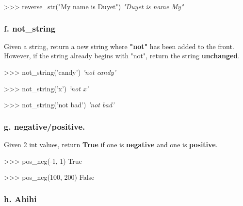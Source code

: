 \documentclass[11pt]{article}
\newenvironment{Shaded}{}{}
\newcommand{\DecValTok}[1]{\textcolor[rgb]{0.25,0.63,0.44}{{#1}}}
\newcommand{\StringTok}[1]{\textcolor[rgb]{0.25,0.44,0.63}{{#1}}}
\newcommand{\CommentTok}[1]{\textcolor[rgb]{0.38,0.63,0.69}{\textit{{#1}}}}
\newcommand{\NormalTok}[1]{{#1}}
\newcommand{\VariableTok}[1]{\textcolor[rgb]{0.10,0.09,0.49}{{#1}}}
\newcommand{\OperatorTok}[1]{\textcolor[rgb]{0.40,0.40,0.40}{{#1}}}
\begin{document}
\begin{Shaded}
\begin{Highlighting}[]
\OperatorTok{>>>}\NormalTok{ reverse_str(}\StringTok{"My name is Duyet"}\NormalTok{)}
    \CommentTok{"Duyet is name My"}
\end{Highlighting}
\end{Shaded}

\subsubsection{f. not\_string}\label{f.-not_string}

Given a string, return a new string where \textbf{"not"} has been added
to the front. However, if the string already begins with "not", return
the string \textbf{unchanged}.

\begin{Shaded}
\begin{Highlighting}[]
\OperatorTok{>>>}\NormalTok{ not_string(}\StringTok{'candy'}\NormalTok{)}
    \CommentTok{'not candy'}
    
\OperatorTok{>>>}\NormalTok{ not_string(}\StringTok{'x'}\NormalTok{)}
    \CommentTok{'not x'}
    
\OperatorTok{>>>}\NormalTok{ not_string(}\StringTok{'not bad'}\NormalTok{)}
    \CommentTok{'not bad'}
\end{Highlighting}
\end{Shaded}

\subsubsection{g. negative/positive.}\label{g.-negativepositive.}

Given 2 int values, return \textbf{True} if one is \textbf{negative} and
one is \textbf{positive}.

\begin{Shaded}
\begin{Highlighting}[]
\OperatorTok{>>>}\NormalTok{ pos_neg(}\OperatorTok{-}\DecValTok{1}\NormalTok{, }\DecValTok{1}\NormalTok{)}
    \VariableTok{True}
    
\OperatorTok{>>>}\NormalTok{ pos_neg(}\DecValTok{100}\NormalTok{, }\DecValTok{200}\NormalTok{)}
    \VariableTok{False}
\end{Highlighting}
\end{Shaded}

\subsubsection{h. Ahihi}\label{h.-ahihi}
\end{document}
